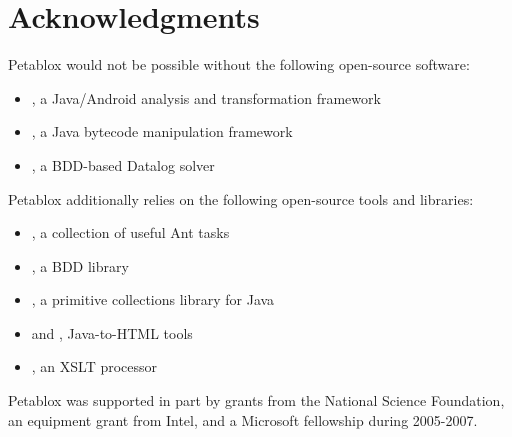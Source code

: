 \chapter{Acknowledgments}
\label{chap:acks}

Petablox would not be possible without the following open-source software:

\begin{itemize}
\item
\soot, a Java/Android analysis and transformation framework
\item
\javassist, a Java bytecode manipulation framework
\item
\bddbddb, a BDD-based Datalog solver
\end{itemize}

Petablox additionally relies on the following open-source tools and libraries:
\begin{itemize}
\item
{}, a collection of useful Ant tasks  
\item
\buddy, a BDD library
\item
{}, a primitive collections library for Java
\item
{} and
, Java-to-HTML tools
\item
{}, an XSLT processor
\end{itemize}

Petablox was supported in part by grants from the National Science Foundation,
an equipment grant from Intel, and a Microsoft fellowship during 2005-2007.

